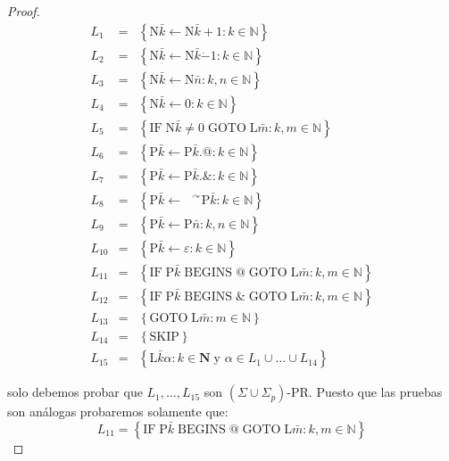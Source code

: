 \begin{proof}
    \begin{eqnarray*}
      L_{1} &=& \left\{\mathrm{N}\bar{k}\leftarrow \mathrm{N}\bar{k}+1:k\in \mathbb{N}\right\} \\
      L_{2} &=& \left\{\mathrm{N}\bar{k}\leftarrow \mathrm{N}\bar{k}\dot{-}1:k\in \mathbb{N}\right\} \\
      L_{3} &=& \left\{\mathrm{N}\bar{k}\leftarrow \mathrm{N}\bar{n}:k,n\in \mathbb{N}\right\} \\
      L_{4} &=& \left\{\mathrm{N}\bar{k}\leftarrow 0:k\in \mathbb{N}\right\} \\
      L_{5} &=& \left\{\mathrm{IF}\;\mathrm{N}\bar{k}\neq 0\;\mathrm{GOTO}\;
                       \mathrm{L}\bar{m}:k,m\in \mathbb{N}\right\} \\
      L_{6} &=& \left\{\mathrm{P}\bar{k}\leftarrow \mathrm{P}\bar{k}.@:k\in \mathbb{N}\right\} \\
      L_{7} &=& \left\{\mathrm{P}\bar{k}\leftarrow \mathrm{P}\bar{k}.\& :k\in \mathbb{N}\right\} \\
      L_{8} &=& \left\{\mathrm{P}\bar{k}\leftarrow \text{ }^{\curvearrowright }
                       \mathrm{P}\bar{k}:k\in \mathbb{N}\right\} \\
      L_{9} &=& \left\{\mathrm{P}\bar{k}\leftarrow \mathrm{P}\bar{n}:k,n\in \mathbb{N}\right\} \\
      L_{10} &=& \left\{\mathrm{P}\bar{k}\leftarrow \varepsilon :k\in \mathbb{N} \right\} \\
      L_{11} &=& \left\{\mathrm{IF}\;\mathrm{P}\bar{k}\;\mathrm{BEGINS}\;@\; \mathrm{GOTO}\;
                        \mathrm{L}\bar{m}:k,m\in \mathbb{N}\right\} \\
      L_{12} &=& \left\{\mathrm{IF}\;\mathrm{P}\bar{k}\;\mathrm{BEGINS}\;\& \; \mathrm{GOTO}\;
                        \mathrm{L}\bar{m}:k,m\in \mathbb{N}\right\} \\
      L_{13} &=& \left\{\mathrm{GOTO}\;\mathrm{L}\bar{m}:m\in \mathbb{N}\right\} \\
      L_{14} &=& \left\{\mathrm{SKIP}\right\} \\
      L_{15} &=& \left\{\mathrm{L}\bar{k}\alpha :k\in \mathbf{N\;}
                        \text{y }\alpha \in L_{1}\cup \dotsc\cup L_{14}\right\}
    \end{eqnarray*}

    \PN solo debemos probar que $L_{1}, \dotsc, L_{15}$ son $(\Sigma \cup \Sigma_{p})$-PR. Puesto que las pruebas son
    análogas probaremos solamente que:
    \[
      L_{11} = \left\{\mathrm{IF}\;\mathrm{P}\bar{k}\;\mathrm{BEGINS}\;@\;\mathrm{GOTO}\;\mathrm{L}\bar{m}: k,m \in
      \mathbb{N}\right\}
    \]


\end{proof}
